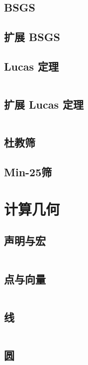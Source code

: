 \documentclass[10pt, a4paper, oneside]{ctexart}
\begin{document}
\begin{multicols}{2}
        \subsection{BSGS}
        
        \subsection{扩展 BSGS}
        
        \subsection{Lucas 定理}
        \inputminted{cpp}{src/number theory/lucas.cpp}
        \subsection{扩展 Lucas 定理}
        \inputminted{cpp}{src/number theory/exlucas.cpp}
        \subsection{杜教筛}
        
        \subsection{Min-25筛}
        

        \section{计算几何}
        \subsection{声明与宏}
        \inputminted{cpp}{src/geometry/define.cpp}
        \subsection{点与向量}
        \inputminted{cpp}{src/geometry/vector.cpp}
        \subsection{线}
        \inputminted{cpp}{src/geometry/line.cpp}
        \subsection{圆}
        \inputminted{cpp}{src/geometry/circle.cpp}

\end{multicols}
\end{document}
